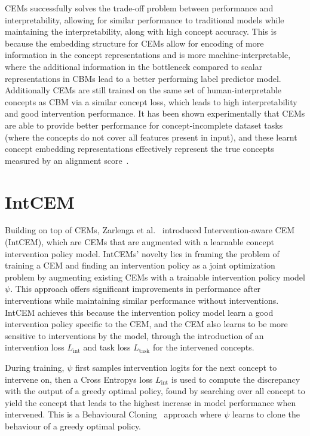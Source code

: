 CEMs successfully solves the trade-off problem between performance and interpretability,
allowing for similar performance to traditional models while maintaining the
interpretability, along with high concept accuracy. This is because the embedding structure
for CEMs allow for encoding of more information
in the concept representations and is more machine-interpretable, where
the additional information in the bottleneck
 compared to scalar representations in CBMs
lead to a better performing label predictor model. Additionally CEMs are still trained 
on the same set of human-interpretable concepts as CBM via a similar concept loss, which leads to
high interpretability and good intervention performance. It has been shown experimentally
that CEMs are able to provide better performance for concept-incomplete dataset tasks (where
the concepts do not cover all features present in input), and these learnt concept
embedding representations effectively represent the true concepts measured by an alignment score~\cite{cem}.


\section{IntCEM} %

Building on top of CEMs, Zarlenga et al.~\cite{intcem} introduced 
Intervention-aware CEM (IntCEM), which are CEMs that are augmented
with a learnable concept intervention policy model. IntCEMs' novelty
lies in framing the problem of training a CEM and finding
an intervention policy as a joint optimization problem by augmenting
existing CEMs with a trainable intervention policy model $\psi$. 
This approach offers significant improvements in performance after 
interventions while maintaining similar performance without 
interventions. 
IntCEM achieves this because the intervention policy model
learn a good intervention policy specific to the CEM, 
and the CEM also learns to be more sensitive to interventions
by the model, through the introduction of an intervention loss 
$L_{\text{int}}$ and task loss $L_{\text{task}}$ for 
the intervened concepts.

During training, $\psi$ first samples intervention
logits for the next concept to intervene on, then 
a Cross Entropys loss $L_{\text{int}}$ is used to
compute the discrepancy with the output of a greedy 
optimal policy, found by searching over all concept to
yield the concept that leads to the highest increase
in model performance when intervened. This is a Behavioural
Cloning~\cite{} approach where $\psi$ learns to clone the behaviour of
a greedy optimal policy.


